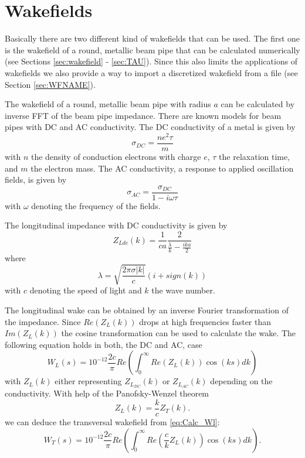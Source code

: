 \chapter{Wakefields}
\label{chp:wakefields}



Basically there are two different kind of wakefields that can be used. The first one is the wakefield of a round, metallic beam pipe that can be calculated numerically (see Sections \ref{sec:wakefield} - \ref{sec:TAU}). Since this also limits the applications of wakefields we also provide a way to import a discretized wakefield from a file (see Section \ref{sec:WFNAME}).

The wakefield of a round, metallic beam pipe with radius $a$ can be calculated by inverse FFT of the beam pipe impedance. There are known models for beam pipes with DC and AC conductivity. The DC conductivity of a metal is given by 
%
\begin{equation}
\sigma_{DC} = \frac{ne^2\tau}{m} \label{eq:dc_cond}
\end{equation}
%
with $n$ the density of conduction electrons with charge $e$, $\tau$ the relaxation time, and $m$ the electron mass. The AC conductivity, a response to applied oscillation fields, is given by 
%
\begin{equation}
\sigma_{AC} = \frac{\sigma_{DC}}{1-i\omega\tau} \label{eq:ac_cond}
\end{equation}
%
with $\omega$ denoting the frequency of the fields.

The longitudinal impedance with DC conductivity is given by
%
\begin{equation}  \label{eq:Z[2]}
 Z_{Ldc}(k) = \dfrac{1}{ca} \dfrac{2}{\frac{\lambda}{k}-\frac{ika}{2}}
\end{equation}
%
where
\begin{equation}
\lambda=\sqrt{\dfrac{2\pi\sigma \vert k\vert}{c}}(i+sign(k))
\end{equation}
%
with $c$ denoting the speed of light and $k$ the wave number. 

The longitudinal wake can be obtained by an inverse Fourier transformation of the impedance. Since $Re(Z_L(k))$ drops at high frequencies faster than $Im(Z_L(k))$ the cosine transformation can be used to calculate the wake. The following equation holds in both, the DC and AC, case
%
\begin{equation} \label{eq:Calc_Wl}
W_L(s)=10^{-12} \dfrac{2c}{\pi}Re\left(\int_0^\infty Re(Z_L(k))\cos (ks)dk\right)
\end{equation}
%
with $Z_L(k)$ either representing $Z_{L_{DC}}(k)$ or $Z_{L_{AC}}(k)$ depending on the conductivity. With help of the Panofsky-Wenzel theorem
%
\begin{equation}
Z_L(k) = \frac{k}{c}Z_T(k).
\end{equation}
%
we can deduce the transversal wakefield from \eqref{eq:Calc_Wl}:
%
\begin{equation} \label{eq:Calc_Wt}
W_T(s)= 10^{-12} \dfrac{2c}{\pi}Re\left(\int_0^\infty Re( \frac{c}{k}Z_L(k))\cos (ks)dk\right).
\end{equation}

